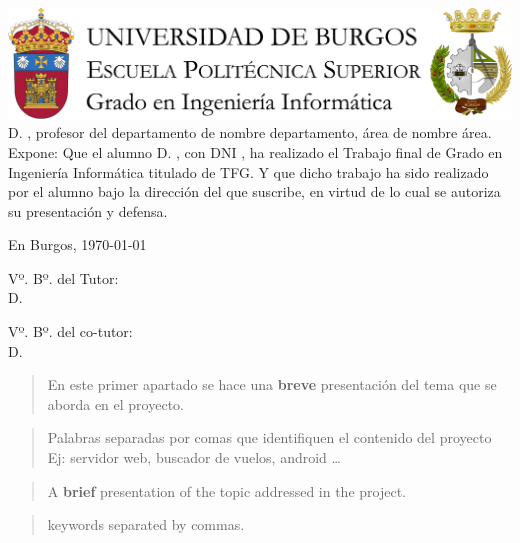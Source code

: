 \documentclass[a4paper,12pt,twoside]{memoir}
\begin{document}
\portada

\newpage\null\thispagestyle{empty}

\newpage\thispagestyle{empty}
\noindent\includegraphics[width=\textwidth]{../assets/cabecera}\vspace{1cm}
\noindent D. \tutor, profesor del departamento de nombre departamento, área de nombre área.
\noindent Expone:
\noindent Que el alumno D. \autor, con DNI \dni, ha realizado el Trabajo final de Grado en Ingeniería Informática titulado \titulo \space de TFG. 
\noindent Y que dicho trabajo ha sido realizado por el alumno bajo la dirección del que suscribe, en virtud de lo cual se autoriza su presentación y defensa.
\begin{center}
    En Burgos, {\large \today}
\end{center}
\vfill\vfill\vfill
\begin{minipage}{0.45\textwidth}
\begin{flushleft}
    Vº. Bº. del Tutor:\\[2cm]
    D. \tutor
\end{flushleft}
\end{minipage}
\hfill
\begin{minipage}{0.45\textwidth}
\begin{flushleft}
    Vº. Bº. del co-tutor:\\[2cm]
    D. \cotutor
\end{flushleft}
\end{minipage}
\hfill
\vfill

\newpage\null\thispagestyle{empty}

\newpage\frontmatter
\renewcommand*\abstractname{Resumen}
\begin{abstract}
    En este primer apartado se hace una \textbf{breve} presentación del tema que se aborda en el proyecto.
\end{abstract}
\renewcommand*\abstractname{Descriptores}
\begin{abstract}
    Palabras separadas por comas que identifiquen el contenido del proyecto Ej: servidor web, buscador de vuelos, android \ldots
\end{abstract}
\clearpage
\renewcommand*\abstractname{Abstract}
\begin{abstract}
    A \textbf{brief} presentation of the topic addressed in the project.
\end{abstract}
\renewcommand*\abstractname{Keywords}
\begin{abstract}
    keywords separated by commas.
\end{abstract}
\clearpage
\end{document}
